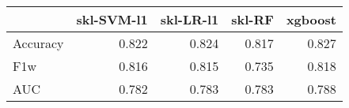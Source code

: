 \begin{tabular}{lrrrr}
\toprule
{} &  skl-SVM-l1 &  skl-LR-l1 &  skl-RF &  xgboost \\
\midrule
Accuracy &       0.822 &      0.824 &   0.817 &    0.827 \\
F1w      &       0.816 &      0.815 &   0.735 &    0.818 \\
AUC      &       0.782 &      0.783 &   0.783 &    0.788 \\
\bottomrule
\end{tabular}
